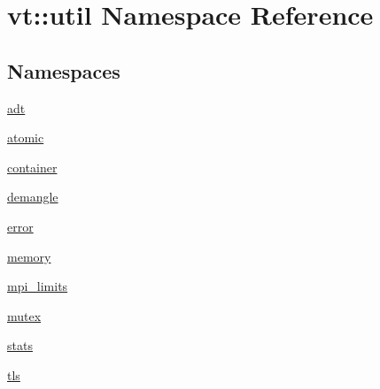 \hypertarget{namespacevt_1_1util}{}\section{vt\+:\+:util Namespace Reference}
\label{namespacevt_1_1util}
\subsection*{Namespaces}
\begin{DoxyCompactItemize}
\item 
 \hyperlink{namespacevt_1_1util_1_1adt}{adt}
\item 
 \hyperlink{namespacevt_1_1util_1_1atomic}{atomic}
\item 
 \hyperlink{namespacevt_1_1util_1_1container}{container}
\item 
 \hyperlink{namespacevt_1_1util_1_1demangle}{demangle}
\item 
 \hyperlink{namespacevt_1_1util_1_1error}{error}
\item 
 \hyperlink{namespacevt_1_1util_1_1memory}{memory}
\item 
 \hyperlink{namespacevt_1_1util_1_1mpi__limits}{mpi\+\_\+limits}
\item 
 \hyperlink{namespacevt_1_1util_1_1mutex}{mutex}
\item 
 \hyperlink{namespacevt_1_1util_1_1stats}{stats}
\item 
 \hyperlink{namespacevt_1_1util_1_1tls}{tls}
\end{DoxyCompactItemize}
